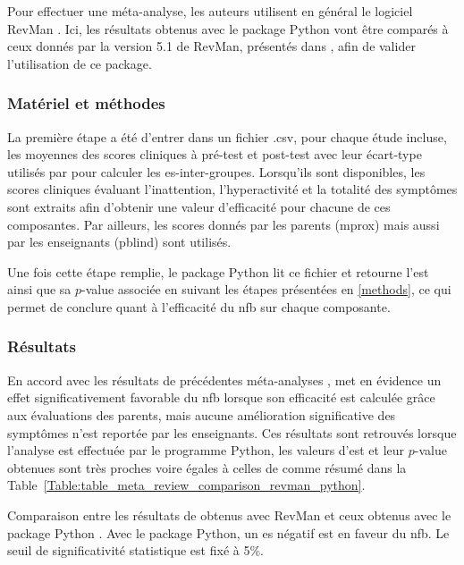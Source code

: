 Pour effectuer une méta-analyse, les auteurs utilisent en général le logiciel RevMan \citep{Revman, Cortese2016, Micoulaud2014}. Ici, les résultats 
obtenus avec le package Python vont être comparés à ceux donnés par la version 5.1 de RevMan, présentés dans \citet{Cortese2016}, 
afin de valider l'utilisation de ce package.

\subsubsection{Matériel et méthodes}
La première étape a été d'entrer dans un fichier .csv, pour chaque étude incluse, les moyennes des scores cliniques à pré-test et post-test avec leur écart-type 
utilisés par \citet{Cortese2016} pour calculer les \gls{es}-inter-groupes. Lorsqu'ils sont disponibles, les scores cliniques évaluant l'inattention, l'hyperactivité 
et la totalité des symptômes sont extraits afin d'obtenir une valeur d'efficacité pour chacune de ces composantes. Par ailleurs, les scores donnés par les
parents (\gls{mprox}) mais aussi par les enseignants (\gls{pblind}) sont utilisés.

Une fois cette étape remplie, le package Python lit ce fichier et retourne l'\gls{est} ainsi que sa $p$-value associée en suivant les étapes présentées en
\ref{methods}, ce qui permet de conclure quant à l'efficacité du \gls{nfb} sur chaque composante.

\subsubsection{Résultats}
En accord avec les résultats de précédentes méta-analyses \citep{Sonuga-Barke2013, Micoulaud2014}, \citet{Cortese2016}
met en évidence un effet significativement favorable du \gls{nfb} lorsque son efficacité est calculée grâce aux évaluations des parents, mais aucune amélioration 
significative des symptômes n'est reportée par les enseignants. Ces résultats sont retrouvés lorsque l'analyse est effectuée par le programme Python, les valeurs
d'\gls{est} et leur $p$-value obtenues sont très proches voire égales à celles de \citet{Cortese2016} comme résumé dans la 
Table~\ref{Table:table_meta_review_comparison_revman_python}. 

\begin{table}[h!]
  \centering
  \caption[Comparaison entre les résultats de \citet{Cortese2016} obtenus avec RevMan \citep{Revman} et ceux obtenus avec le package Python.]{Comparaison entre les résultats de \citet{Cortese2016} obtenus avec RevMan \citep{Revman} et ceux obtenus avec le package Python \citep{Bussalb2019clinical}.
	Avec le package Python, un \gls{es} négatif est en faveur du \gls{nfb}. Le seuil de significativité statistique est fixé à 5\%.}
  
  \label{Table:table_meta_review_comparison_revman_python}
\end{table}

